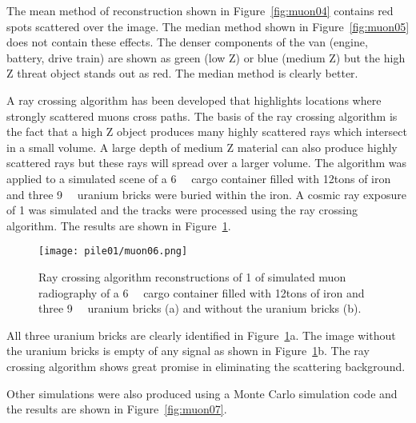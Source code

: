 \documentclass[twoside,titlepage,11pt,twocolumn,a4paper]{article}
\begin{document}
The mean method of reconstruction shown in Figure~\ref{fig:muon04}
contains red spots scattered over the image.  The median method shown
in Figure~\ref{fig:muon05} does not contain these effects. The denser
components of the van (engine, battery, drive train) are shown as
green (low Z) or blue (medium Z) but the high Z threat object stands out
as red. The median method is clearly
better. \citep{statisticalRec2007}

A ray crossing algorithm has been developed that highlights locations
where strongly scattered muons cross paths. The basis of the ray
crossing algorithm is the fact that a high Z object produces many
highly scattered rays which intersect in a small volume. A large depth
of medium Z material can also produce highly scattered rays but these
rays will spread over a larger volume. The algorithm was applied to a
simulated scene of a \unit{6}{\cubic\metre} cargo
container filled with \unit{12}{tons} of iron and three
\unit{9}{\cubic{\centi\metre}} uranium bricks were
buried within the iron. A cosmic ray exposure of \unit{1}{\minute} was
simulated and the tracks were processed using the ray crossing
algorithm. The results are shown in
Figure~\ref{fig:muon06}. \citep{imageRec2004}

\begin{figure}
  \texttt{[image: pile01/muon06.png]}
  \caption{Ray crossing algorithm reconstructions of \unit{1}{\minute}
    of simulated muon radiography of a
    \unit{6}{\cubic\metre} cargo container filled
    with \unit{12}{tons} of iron and three
    \unit{9}{\cubic{\centi\metre}} uranium bricks (a)
    and without the uranium bricks (b). \citep{imageRec2004}}
  \label{fig:muon06}
\end{figure}

All three uranium bricks are clearly identified in
Figure~\ref{fig:muon06}a. The image without the uranium bricks is
empty of any signal as shown in Figure~\ref{fig:muon06}b. The ray
crossing algorithm shows great promise in eliminating the scattering
background. \citep{imageRec2004}

Other simulations were also produced using a Monte Carlo simulation
code and the results are shown in Figure~\ref{fig:muon07}.
\end{document}
